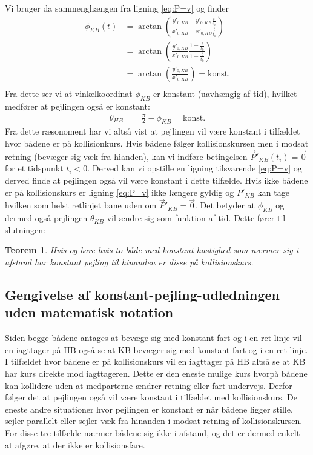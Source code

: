 \documentclass[%
 reprint,
nofootinbib,
aps,
]{revtex4-1}
\newtheorem{theorem}{Teorem}
\begin{document}
Vi bruger da sammenghængen fra ligning \ref{eq:P=v} og finder
\begin{align*}
  \phi_{KB}(t) &= \arctan{\left( \frac{y'_{0,KB} - y'_{0,KB}\frac{t}{t_k}}{x'_{0,KB} - x'_{0,KB}\frac{t}{t_k}}\right)} \\
  &= \arctan{\left(\frac{y'_{0,KB}}{x'_{0,KB}} \frac{1 - \frac{t}{t_k}}{1 - \frac{t}{t_k}}\right)} \\
  &= \arctan{\left(\frac{y'_{0,KB}}{x'_{0,KB}}\right)} = \text{konst.} \\
\end{align*}
Fra dette ser vi at vinkelkoordinat $\phi_{KB}$ er konstant (uavhængig af tid), hvilket medfører at pejlingen også er konstant:
\begin{align*}
  \theta_{HB} &= \frac{\pi}{2} - \phi_{KB} = \text{konst.}
\end{align*}
Fra dette ræsonoment har vi altså vist at pejlingen vil være konstant i tilfældet hvor bådene er på kollisionkurs. Hvis bådene følger kollisionskursen men i modsat retning (bevæger sig væk fra hianden), kan vi indføre betingelsen $\vec{P}'_{KB}(t_i) = \vec{0}$ for et tidspunkt $t_i < 0$. Derved kan vi opstille en ligning tilsvarende \ref{eq:P=v} og derved finde at pejlingen også vil være konstant i dette tilfælde. Hvis ikke bådene er på kollisionskurs er ligning \ref{eq:P=v} ikke længere gyldig og $P'_{KB}$ kan tage hvilken som helst retlinjet bane uden om $\vec{P}'_{KB} = \vec{0}$. Det betyder at $\phi_{KB}$ og dermed også pejlingen $\theta_{KB}$ vil ændre sig som funktion af tid. Dette fører til slutningen:
\begin{theorem}
  Hvis og bare hvis to både med konstant hastighed som nærmer sig i afstand har konstant pejling til hinanden er disse på kollisionskurs.
  \label{Teo:pejling}
\end{theorem}
\subsection{Gengivelse af konstant-pejling-udledningen uden matematisk notation}
Siden begge bådene antages at bevæge sig med konstant fart og i en ret linje vil en iagttager på HB også se at KB bevæger sig med konstant fart og i en ret linje. I tilfældet hvor bådene er på kollisionskurs vil en iagttager på HB altså se at KB har kurs direkte mod iagttageren. Dette er den eneste mulige kurs hvorpå bådene kan kollidere uden at medparterne ændrer retning eller fart undervejs. Derfor følger det at pejlingen også vil være konstant i tilfældet med kollisionskurs. De eneste andre situationer hvor pejlingen er konstant er når bådene ligger stille, sejler parallelt eller sejler væk fra hinanden i modsat retning af kollisionskursen. For disse tre tilfælde nærmer bådene sig ikke i afstand, og det er dermed enkelt at afgøre, at der ikke er kollisionsfare.
\end{document}
